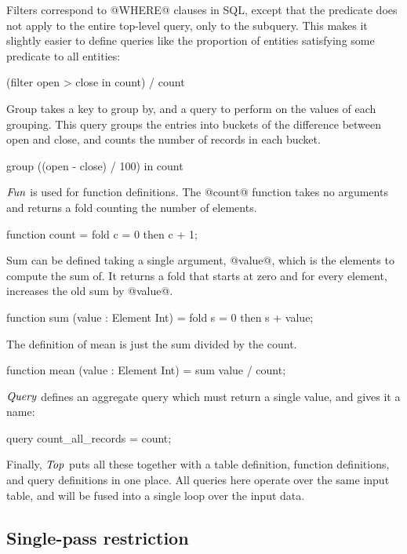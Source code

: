 Filters correspond to @WHERE@ clauses in SQL, except that the predicate does not apply to the entire top-level query, only to the subquery.
This makes it slightly easier to define queries like the proportion of entities satisfying some predicate to all entities: 
\begin{code}
(filter open > close in count) / count
\end{code}

Group takes a key to group by, and a query to perform on the values of each grouping.
This query groups the entries into buckets of the difference between open and close, and counts the number of records in each bucket.
\begin{code}
group ((open - close) / 100) in count
\end{code}

$\mathit{Fun}$ is used for function definitions.
The @count@ function takes no arguments and returns a fold counting the number of elements.
\begin{code}
function count
 = fold c = 0 then c + 1;
\end{code}

Sum can be defined taking a single argument, @value@, which is the elements to compute the sum of.
It returns a fold that starts at zero and for every element, increases the old sum by @value@.
\begin{code}
function sum (value : Element Int)
 = fold s = 0 then s + value;
\end{code}

The definition of mean is just the sum divided by the count.
\begin{code}
function mean (value : Element Int)
 = sum value / count;
\end{code}

$\mathit{Query}$ defines an aggregate query which must return a single value, and gives it a name:
\begin{code}
query count_all_records = count;
\end{code}

Finally, $\mathit{Top}$ puts all these together with a table definition, function definitions, and query definitions in one place.
All queries here operate over the same input table, and will be fused into a single loop over the input data.



\subsection{Single-pass restriction}

